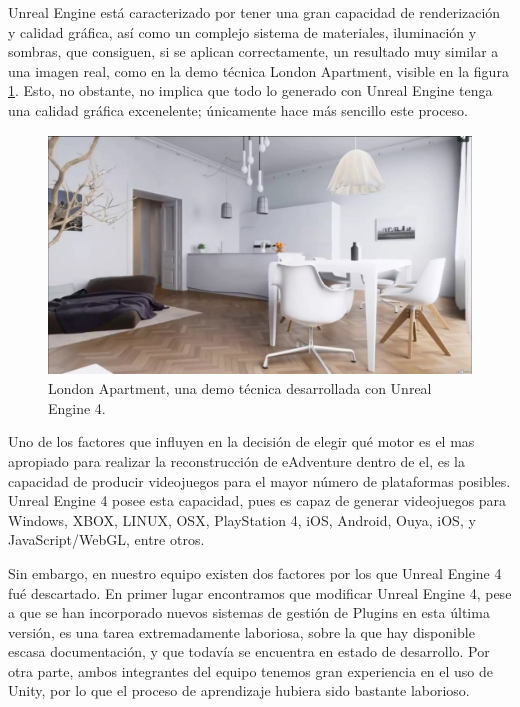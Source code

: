 Unreal Engine está caracterizado por tener una gran capacidad de renderización y calidad gráfica, así como un complejo sistema de materiales, iluminación y sombras, que consiguen, si se aplican correctamente, un resultado muy similar a una imagen real, como en la demo técnica London Apartment, visible en la figura \ref{londonapartment}. Esto, no obstante, no implica que todo lo generado con Unreal Engine tenga una calidad gráfica excenelente; únicamente hace más sencillo este proceso.

\begin{figure}[htb]
	\includegraphics[height=2.5in]{figures/london-apartment.jpg}
	\caption[Unreal Engine 4 - London Apartment]{London Apartment, una demo técnica desarrollada con Unreal Engine 4.}
	\label{londonapartment}
\end{figure}

Uno de los factores que influyen en la decisión de elegir qué motor es el mas apropiado para realizar la reconstrucción de eAdventure dentro de el, es la capacidad de producir videojuegos para el mayor número de plataformas posibles. Unreal Engine 4 posee esta capacidad, pues es capaz de generar videojuegos para Windows, XBOX, LINUX, OSX, PlayStation 4, iOS, Android, Ouya, iOS, y JavaScript/WebGL, entre otros.

Sin embargo, en nuestro equipo existen dos factores por los que Unreal Engine 4 fué descartado. En primer lugar encontramos que modificar Unreal Engine 4, pese a que se han incorporado nuevos sistemas de gestión de Plugins en esta última versión, es una tarea extremadamente laboriosa, sobre la que hay disponible escasa documentación, y que todavía se encuentra en estado de desarrollo. Por otra parte, ambos integrantes del equipo tenemos gran experiencia en el uso de Unity, por lo que el proceso de aprendizaje hubiera sido bastante laborioso.

\subsubsection{}
\label{unreal}


